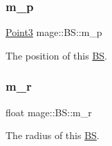 \subsubsection{\texorpdfstring{m\+\_\+p}{m\_p}}
{\footnotesize\ttfamily \hyperlink{structmage_1_1_point3}{Point3} mage\+::\+B\+S\+::m\+\_\+p}

The position of this \hyperlink{structmage_1_1_b_s}{BS}. \hypertarget{structmage_1_1_b_s_a7a783b2ad117fc19a1caf548e3033df6}{}\label{structmage_1_1_b_s_a7a783b2ad117fc19a1caf548e3033df6} 
\subsubsection{\texorpdfstring{m\+\_\+r}{m\_r}}
{\footnotesize\ttfamily float mage\+::\+B\+S\+::m\+\_\+r}

The radius of this \hyperlink{structmage_1_1_b_s}{BS}. 